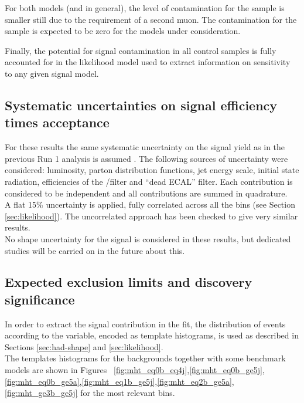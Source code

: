 For both models (and in general), the level of contamination for the
\mmj sample is smaller still due to the requirement of a second
muon. The contamination for the \gj sample is expected to be zero for
the models under consideration. 

Finally, the potential for signal contamination in all control samples
is fully accounted for in the likelihood model used to extract
information on sensitivity to any given signal model.

\subsection{Systematic uncertainties on signal efficiency times acceptance}
\label{sec:sig-syst}

For these results the same systematic uncertainty on the signal yield 
as in the previous Run 1 analysis is assumed \cite{CMS_AN_2013-366}. 
The following sources of uncertainty were considered: 
luminosity, parton distribution
functions, jet energy scale, initial state radiation, 
efficiencies of the \mht/\met filter and ``dead ECAL'' filter. 
Each contribution is considered to be independent and all contributions are
summed in quadrature. \\
A flat 15\% uncertainty is applied, fully correlated across all the bins (see Section \ref{sec:likelihood}). 
The uncorrelated approach has been checked to give very similar results. \\
No shape uncertainty for the signal is considered in these results, 
but dedicated studies will be carried on in the future about this.


\subsection{Expected exclusion limits and discovery significance}
\label{subsec:susy_results}

In order to extract the signal contribution in the fit, the distribution of events according to the \mht variable, 
encoded as template histograms, is used as described in Sections \ref{sec:had-shape} and \ref{sec:likelihood}. \\
The \mht templates histograms for the backgrounds together with some benchmark models are shown in Figures ~\ref{fig:mht_eq0b_eq4j},\ref{fig:mht_eq0b_ge5j},\ref{fig:mht_eq0b_ge5a},\ref{fig:mht_eq1b_ge5j},\ref{fig:mht_eq2b_ge5a},\ref{fig:mht_ge3b_ge5j} for the most relevant \HT bins. 

